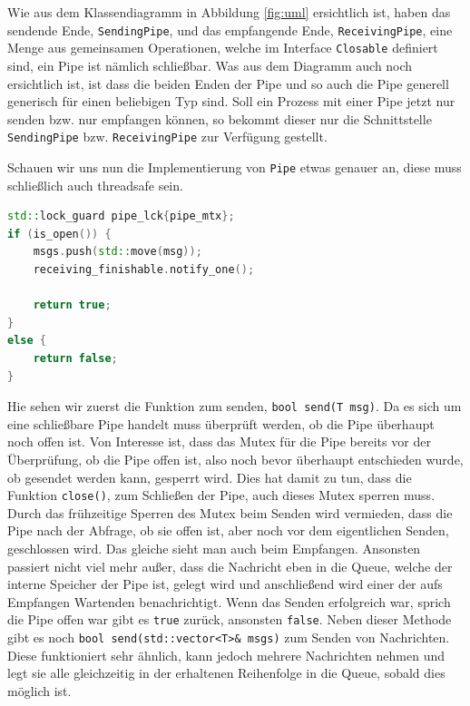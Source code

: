 Wie aus dem Klassendiagramm in Abbildung \ref{fig:uml} ersichtlich ist, haben das sendende Ende, \verb|SendingPipe|, und das empfangende Ende, \verb|ReceivingPipe|, eine Menge aus 
gemeinsamen Operationen, welche im Interface \verb|Closable| definiert sind, ein Pipe ist nämlich schließbar. Was aus dem Diagramm auch noch ersichtlich ist, ist dass die beiden
Enden der Pipe und so auch die Pipe generell generisch für einen beliebigen Typ sind. Soll ein Prozess mit einer Pipe jetzt nur senden bzw. nur empfangen können, so bekommt
dieser nur die Schnittstelle \verb|SendingPipe| bzw. \verb|ReceivingPipe| zur Verfügung gestellt.

Schauen wir uns nun die Implementierung von \verb|Pipe| etwas genauer an, diese muss schließlich auch threadsafe sein.

\noindent\hrulefill\par
\begin{minipage}{\linewidth}
\begin{lstlisting}[language=C++, caption=Senden einer Nachricht ... bool send(T msg)]
std::lock_guard pipe_lck{pipe_mtx};
if (is_open()) {
    msgs.push(std::move(msg));
    receiving_finishable.notify_one();

    return true;
}
else {
    return false;
}  
\end{lstlisting}
\end{minipage}

Hie sehen wir zuerst die Funktion zum senden, \verb|bool send(T msg)|. Da es sich um eine schließbare Pipe handelt muss überprüft werden, ob die Pipe überhaupt noch offen ist.
Von Interesse ist, dass das Mutex für die Pipe bereits vor der Überprüfung, ob die Pipe offen ist, also noch bevor überhaupt entschieden wurde, ob gesendet werden kann, gesperrt 
wird. Dies hat damit zu tun, dass die Funktion \verb|close()|, zum Schließen der Pipe, auch dieses Mutex sperren muss. Durch das frühzeitige Sperren des Mutex beim Senden
wird vermieden, dass die Pipe nach der Abfrage, ob sie offen ist, aber noch vor dem eigentlichen Senden, geschlossen wird. Das gleiche sieht man auch beim Empfangen.
Ansonsten passiert nicht viel mehr außer, dass die Nachricht eben in die Queue, welche der interne Speicher der Pipe ist, gelegt wird und anschließend wird einer der aufs Empfangen
Wartenden benachrichtigt. Wenn das Senden erfolgreich war, sprich die Pipe offen war gibt es \verb|true| zurück, ansonsten \verb|false|.
Neben dieser Methode gibt es noch \verb|bool send(std::vector<T>& msgs)| zum Senden von Nachrichten. Diese funktioniert sehr ähnlich, kann jedoch mehrere Nachrichten nehmen
und legt sie alle gleichzeitig in der erhaltenen Reihenfolge in die Queue, sobald dies möglich ist.\\

